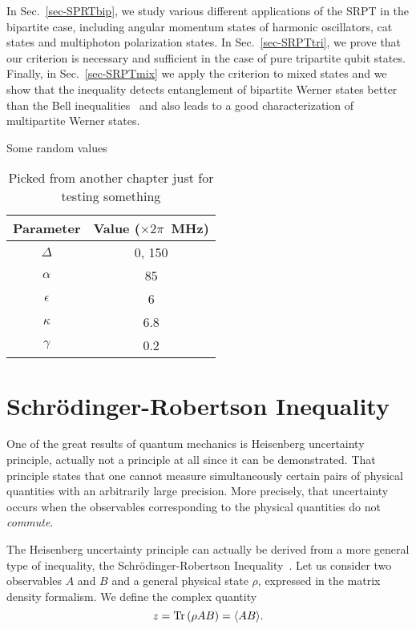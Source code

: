 In Sec.~\ref{sec-SPRTbip}, we study various different applications of the SRPT in the bipartite case, including angular momentum states of harmonic oscillators, cat states and multiphoton polarization states. In Sec.~\ref{sec-SRPTtri}, we prove that our criterion is necessary and sufficient in the case of pure tripartite qubit states. Finally, in Sec.~\ref{sec-SRPTmix} we apply the criterion to mixed states and we show that the inequality detects entanglement of bipartite Werner states better than the Bell inequalities~\cite{Bel64} and also leads to a good characterization of multipartite Werner states.

\begin{table} \begin{center}
  \caption{Some random values}
  \begin{tabular}{c|c}
      Parameter    & Value ($\times 2 \pi$~MHz) \\ \hline \hline
      $\Delta$     & 0, 150                     \\
      ${\alpha}$   & 85                         \\
      ${\epsilon}$ & 6                          \\
      ${\kappa}$   & 6.8                        \\
      ${\gamma}$   & 0.2
  \end{tabular}
  \caption*{Picked from another chapter just for testing something}
\end{center}\end{table}

\section{Schr\"odinger-Robertson Inequality} \label{sec-SRI}

One of the great results of quantum mechanics is Heisenberg uncertainty principle, actually not a principle at all since it can be demonstrated. That principle states that one cannot measure simultaneously certain pairs of physical quantities with an arbitrarily large precision. More precisely, that uncertainty occurs when the observables corresponding to the physical quantities do not \emph{commute}.

The Heisenberg uncertainty principle can actually be derived from a more general type of inequality, the Schr\"odinger-Robertson Inequality~\cite{Sch30}. Let us consider two observables $A$ and $B$ and a general physical state $\rho$, expressed in the matrix density formalism. We define the complex quantity
\[ z=\mbox{\textup{Tr}}\left( \rho A B \right)= \langle AB \rangle.\]

